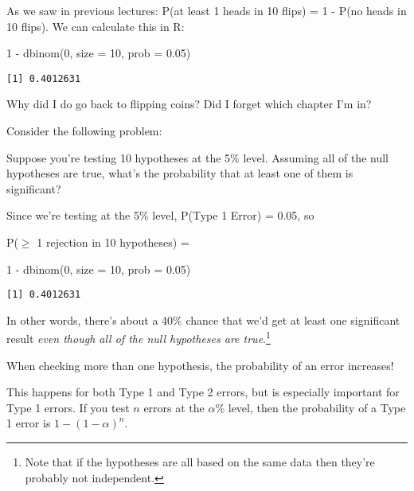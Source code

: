 \documentclass[
  letterpaper,
  DIV=11,
  numbers=noendperiod]{scrreprt}
\newenvironment{Shaded}{\begin{snugshade}}{\end{snugshade}}
\newcommand{\AttributeTok}[1]{\textcolor[rgb]{0.40,0.45,0.13}{#1}}
\newcommand{\DecValTok}[1]{\textcolor[rgb]{0.68,0.00,0.00}{#1}}
\newcommand{\FloatTok}[1]{\textcolor[rgb]{0.68,0.00,0.00}{#1}}
\newcommand{\FunctionTok}[1]{\textcolor[rgb]{0.28,0.35,0.67}{#1}}
\newcommand{\NormalTok}[1]{\textcolor[rgb]{0.00,0.23,0.31}{#1}}
\newcommand{\SpecialCharTok}[1]{\textcolor[rgb]{0.37,0.37,0.37}{#1}}
\begin{document}
As we saw in previous lectures: P(at least 1 heads in 10 flips) = 1 -
P(no heads in 10 flips). We can calculate this in R:

\begin{Shaded}
\begin{Highlighting}[]
\DecValTok{1} \SpecialCharTok{{-}} \FunctionTok{dbinom}\NormalTok{(}\DecValTok{0}\NormalTok{, }\AttributeTok{size =} \DecValTok{10}\NormalTok{, }\AttributeTok{prob =} \FloatTok{0.05}\NormalTok{)}
\end{Highlighting}
\end{Shaded}

\begin{verbatim}
[1] 0.4012631
\end{verbatim}

Why did I do go back to flipping coins? Did I forget which chapter I'm
in?

Consider the following problem:

Suppose you're testing 10 hypotheses at the 5\% level. Assuming all of
the null hypotheses are true, what's the probability that at least one
of them is significant?

Since we're testing at the 5\% level, P(Type 1 Error) = 0.05, so

P(\(\ge\) 1 rejection in 10 hypotheses) =

\begin{Shaded}
\begin{Highlighting}[]
\DecValTok{1} \SpecialCharTok{{-}} \FunctionTok{dbinom}\NormalTok{(}\DecValTok{0}\NormalTok{, }\AttributeTok{size =} \DecValTok{10}\NormalTok{, }\AttributeTok{prob =} \FloatTok{0.05}\NormalTok{)}
\end{Highlighting}
\end{Shaded}

\begin{verbatim}
[1] 0.4012631
\end{verbatim}

In other words, there's about a 40\% chance that we'd get at least one
significant result \emph{even though all of the null hypotheses are
true}.\footnote{Note that if the hypotheses are all based on the same
  data then they're probably not independent.}

\begin{tcolorbox}[enhanced jigsaw, toptitle=1mm, colbacktitle=quarto-callout-important-color!10!white, breakable, leftrule=.75mm, left=2mm, opacityback=0, colframe=quarto-callout-important-color-frame, rightrule=.15mm, toprule=.15mm, bottomtitle=1mm, titlerule=0mm, title=\textcolor{quarto-callout-important-color}{\faExclamation}\hspace{0.5em}{The Multiple Comparisons Problem}, arc=.35mm, colback=white, bottomrule=.15mm, opacitybacktitle=0.6, coltitle=black]

When checking more than one hypothesis, the probability of an error
increases!

This happens for both Type 1 and Type 2 errors, but is especially
important for Type 1 errors. If you test \(n\) errors at the
\(\alpha\)\% level, then the probability of a Type 1 error is
\(1 -(1 - \alpha)^n\).

\end{tcolorbox}
\end{document}
